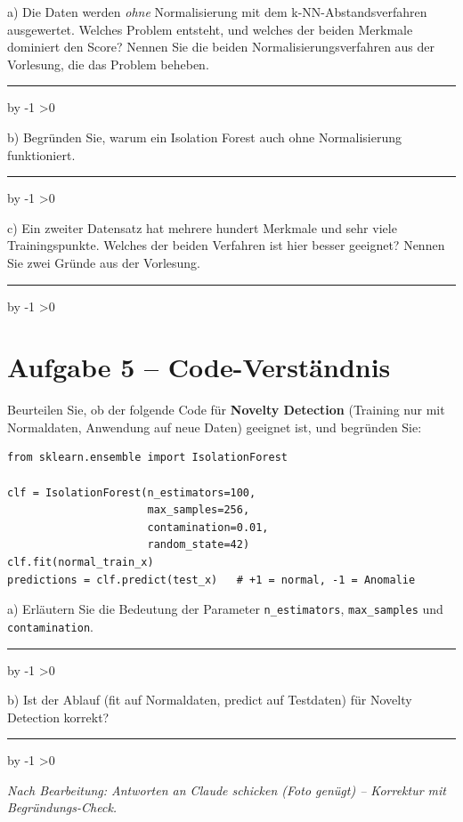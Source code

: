\documentclass[10pt,a4paper]{article}
\newcommand{\antwortlinien}[1]{%
  \par\vspace{2pt}%
  \newcount\zeilen \zeilen=#1
  \loop
    \noindent\rule{\linewidth}{0.4pt}\par\vspace{11pt}%
    \advance\zeilen by -1
  \ifnum\zeilen>0 \repeat
}
\begin{document}
a) Die Daten werden \emph{ohne} Normalisierung mit dem k-NN-Abstandsverfahren ausgewertet.
Welches Problem entsteht, und welches der beiden Merkmale dominiert den Score?
Nennen Sie die beiden Normalisierungsverfahren aus der Vorlesung, die das Problem beheben.
\antwortlinien{3}

b) Begründen Sie, warum ein Isolation Forest auch ohne Normalisierung funktioniert.
\antwortlinien{2}

c) Ein zweiter Datensatz hat mehrere hundert Merkmale und sehr viele Trainingspunkte.
Welches der beiden Verfahren ist hier besser geeignet? Nennen Sie zwei Gründe aus der Vorlesung.
\antwortlinien{3}

\section*{Aufgabe 5 -- Code-Verständnis}

\Needspace*{7cm}
Beurteilen Sie, ob der folgende Code für \textbf{Novelty Detection} (Training nur mit Normaldaten,
Anwendung auf neue Daten) geeignet ist, und begründen Sie:

\begin{lstlisting}
from sklearn.ensemble import IsolationForest

clf = IsolationForest(n_estimators=100,
                      max_samples=256,
                      contamination=0.01,
                      random_state=42)
clf.fit(normal_train_x)
predictions = clf.predict(test_x)   # +1 = normal, -1 = Anomalie
\end{lstlisting}

a) Erläutern Sie die Bedeutung der Parameter \texttt{n\_estimators}, \texttt{max\_samples}
und \texttt{contamination}.
\antwortlinien{3}

b) Ist der Ablauf (fit auf Normaldaten, predict auf Testdaten) für Novelty Detection korrekt?
\antwortlinien{2}

\vspace{10pt}
\begin{center}
\footnotesize\itshape
Nach Bearbeitung: Antworten an Claude schicken (Foto genügt) -- Korrektur mit Begründungs-Check.
\end{center}
\end{document}
